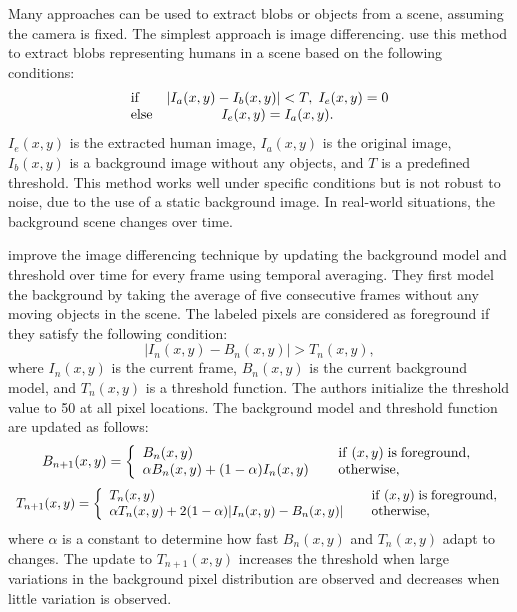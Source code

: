 Many approaches can be used to extract blobs or objects from a scene,
assuming the camera is fixed. The simplest approach is image
differencing.  use this method to extract
blobs representing humans in a scene based on the following
conditions:
\[
  \begin{array}{lc}
    {\rm if} & |{I_a (x,y) - I_b (x,y)}|< T,\;I_e (x,y) = 0 \\ 
    {\rm else} & I_e (x,y) = I_a (x,y).
  \end{array}
\]
$I_e (x,y)$ is the extracted human image, $I_a (x,y)$ is the original
image, $I_b (x,y)$ is a background image without any objects, and $T$
is a predefined threshold. This method works well under specific
conditions but is not robust to noise, due to the use of a static
background image. In real-world situations, the background scene
changes over time.

 improve the image differencing 
technique by updating the background model and threshold over time for
every frame using temporal averaging. They first model the background
by taking the average of five consecutive frames without any moving 
objects in
the scene. The labeled pixels are considered as foreground if they
satisfy the following condition:
\[
  |{I_n (x,y) - B_n (x,y)}| > T_n (x,y),
\]
where $I_n (x,y)$ is the current frame, $B_n (x,y)$ is the current
background model, and $T_n (x,y)$ is a threshold function. The authors
initialize the threshold value to 50 at all pixel locations. The
background model and threshold function are updated as follows:
\[
  \begin{array}{ll}
    B_{n + 1} (x,y) = \left\{ 
    \begin{array}{l}
      B_n (x,y) \\ 
      \alpha B_n (x,y) + (1 - \alpha )I_n (x,y) 
    \end{array} \right.
    &
    \begin{array}{l}
      {\rm if}\;(x,y)\;{\rm is}\;{\rm foreground}, \hfill  \\
      {\rm otherwise}, \hfill 
    \end{array}
  \end{array}
\]
\[
  \begin{array}{ll}
    T_{n + 1} (x,y) = \left\{
    \begin{array}{l}
      T_n (x,y) \\ 
      \alpha T_n (x,y) + 2(1 - \alpha)| {I_n (x,y) - B_n (x,y)}|
    \end{array} \right.
    &
    \begin{array}{l}
      {\rm if}\;(x,y)\;{\rm is}\;{\rm foreground}, \hfill  \\
      {\rm otherwise}, \hfill 
    \end{array}
  \end{array}
\]
where $\alpha$ is a constant to determine how fast $B_n (x,y)$ and
$T_n (x,y)$ adapt to changes. The update to $T_{n+1}(x, y)$ increases
the threshold when large variations in the background pixel
distribution are observed and decreases when little variation is
observed.

